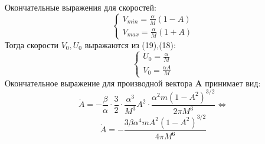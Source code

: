 \documentclass[12pt]{article}
\begin{document}
	Окончательные выражения для скоростей:
	\begin{equation}\begin{cases}
	V_{min} = \frac{\alpha}{M}(1-A) \\
	V_{max} = \frac{\alpha}{M}(1+A)
	\end{cases}
	\end{equation}
	Тогда скорости $V_0,U_0$ выражаются из (19),(18):
	\begin{equation}
	\begin{cases}
	U_0 = \frac{\alpha}{M} \\ 
	V_0 = \frac{\alpha A}{M}
	\end{cases}
	\end{equation}
	Окончательное выражение для производной вектора $\mathbf{A}$ принимает вид:
	\[
		\dot{A} = -\frac{\beta}{\alpha}\cdot\frac{3}{2}\cdot\frac{\alpha^3}{M^3}A^2 \cdot \frac{\alpha^2 m (1-A^2)^{3/2}}{2\pi M^3} \Leftrightarrow
	\]
	\begin{equation}
		\boxed{\dot{A} = -\frac{3\beta\alpha^4 m A^2 (1-A^2)^{3/2}}{4\pi M^6}}
	\end{equation}
\end{document}
